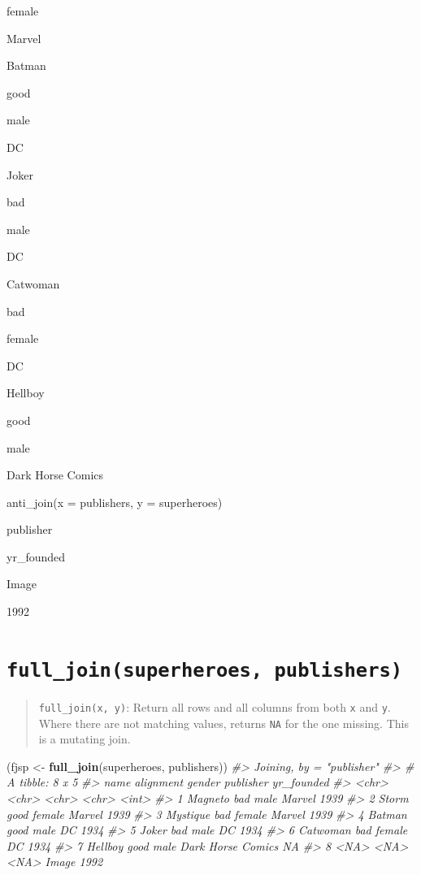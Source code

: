 \documentclass[
]{book}
\newenvironment{Shaded}{\begin{snugshade}}{\end{snugshade}}
\newcommand{\CommentTok}[1]{\textcolor[rgb]{0.56,0.35,0.01}{\textit{#1}}}
\newcommand{\KeywordTok}[1]{\textcolor[rgb]{0.13,0.29,0.53}{\textbf{#1}}}
\newcommand{\NormalTok}[1]{#1}
\newcommand{\StringTok}[1]{\textcolor[rgb]{0.31,0.60,0.02}{#1}}
\begin{document}
female

Marvel

Batman

good

male

DC

Joker

bad

male

DC

Catwoman

bad

female

DC

Hellboy

good

male

Dark Horse Comics

anti\_join(x = publishers, y = superheroes)

publisher

yr\_founded

Image

1992

\hypertarget{full_joinsuperheroes-publishers}{%
\section{\texorpdfstring{\texttt{full\_join(superheroes,\ publishers)}}{full\_join(superheroes, publishers)}}\label{full_joinsuperheroes-publishers}}

\begin{quote}
\texttt{full\_join(x,\ y)}: Return all rows and all columns from both \texttt{x} and \texttt{y}. Where there are not matching values, returns \texttt{NA} for the one missing. This is a mutating join.
\end{quote}

\begin{Shaded}
\begin{Highlighting}[]
\NormalTok{(fjsp <-}\StringTok{ }\KeywordTok{full_join}\NormalTok{(superheroes, publishers))}
\CommentTok{#> Joining, by = "publisher"}
\CommentTok{#> # A tibble: 8 x 5}
\CommentTok{#>   name     alignment gender publisher         yr_founded}
\CommentTok{#>   <chr>    <chr>     <chr>  <chr>                  <int>}
\CommentTok{#> 1 Magneto  bad       male   Marvel                  1939}
\CommentTok{#> 2 Storm    good      female Marvel                  1939}
\CommentTok{#> 3 Mystique bad       female Marvel                  1939}
\CommentTok{#> 4 Batman   good      male   DC                      1934}
\CommentTok{#> 5 Joker    bad       male   DC                      1934}
\CommentTok{#> 6 Catwoman bad       female DC                      1934}
\CommentTok{#> 7 Hellboy  good      male   Dark Horse Comics         NA}
\CommentTok{#> 8 <NA>     <NA>      <NA>   Image                   1992}
\end{Highlighting}
\end{Shaded}
\end{document}
